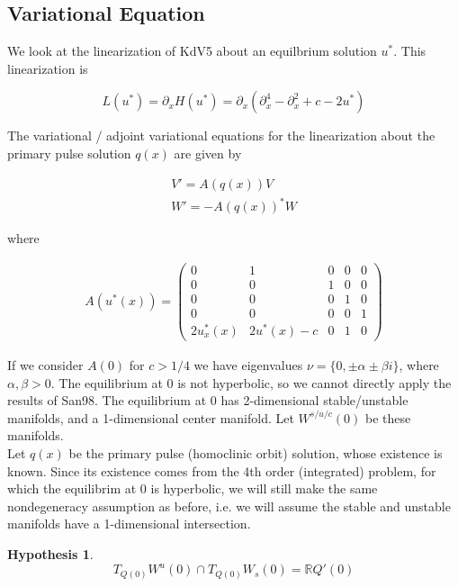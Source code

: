 \documentclass[12pt]{article}
\def\R{{\mathbb R}}
\newtheorem{hypothesis}{Hypothesis}
\begin{document}
\subsection*{Variational Equation}

We look at the linearization of KdV5 about an equilbrium solution $u^*$. This linearization is

\begin{equation}
L(u^*) = \partial_x H(u^*) = \partial_x ( \partial_x^4 - \partial_x^2 + c - 2 u^*)
\end{equation}

The variational / adjoint variational equations for the linearization about the primary pulse solution $q(x)$ are given by

\begin{align}
V' = A(q(x))V \label{vareq} \\
W' = -A(q(x))^*W \label{adjvareq}
\end{align}

where

\begin{align}
A(u^*(x)) = \begin{pmatrix}0 & 1 & 0 & 0 & 0 \\ 0 & 0 & 1 & 0 & 0 \\ 0 & 0 & 0 & 1 & 0 \\ 0 & 0 & 0 & 0 & 1 \\
2u^*_x(x) & 2u^*(x) - c & 0 & 1 & 0 \end{pmatrix}
\end{align}

If we consider $A(0)$ for $c > 1/4$ we have eigenvalues $\nu = \{ 0, \pm \alpha \pm \beta i\}$, where $\alpha, \beta > 0$. The equilibrium at 0 is not hyperbolic, so we cannot directly apply the results of San98. The equilibrium at 0 has 2-dimensional stable/unstable manifolds, and a 1-dimensional center manifold. Let $W^{s/u/c}(0)$ be these manifolds.\\

Let $q(x)$ be the primary pulse (homoclinic orbit) solution, whose existence is known. Since its existence comes from the 4th order (integrated) problem, for which the equilibrim at 0 is hyperbolic, we will still make the same nondegeneracy assumption as before, i.e. we will assume the stable and unstable manifolds have a 1-dimensional intersection.

\begin{hypothesis}\label{nondegen}
\[
T_{Q(0)} W^u(0) \cap T_{Q(0)} W_s(0) = \R Q'(0)
\]
\end{hypothesis}
\end{document}
